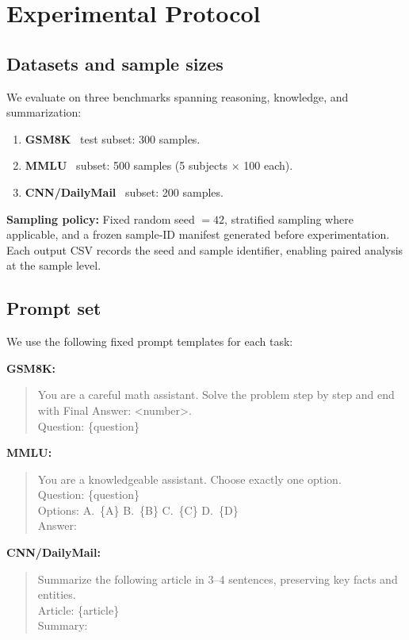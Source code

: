 \section{Experimental Protocol}
\label{sec:protocol}

\subsection{Datasets and sample sizes}

We evaluate on three benchmarks spanning reasoning, knowledge, and summarization:
\begin{enumerate}
    \item \textbf{GSM8K}~\cite{Cobbe2021} test subset: 300 samples.
    \item \textbf{MMLU}~\cite{Hendrycks2020} subset: 500 samples (5 subjects $\times$ 100 each).
    \item \textbf{CNN/DailyMail}~\cite{Narayan2018} subset: 200 samples.
\end{enumerate}

\noindent\textbf{Sampling policy:} Fixed random seed $= 42$, stratified sampling where applicable, and a frozen sample-ID manifest generated before experimentation. Each output CSV records the seed and sample identifier, enabling paired analysis at the sample level.

\subsection{Prompt set}

We use the following fixed prompt templates for each task:

\smallskip\noindent\textbf{GSM8K:}
\begin{quote}\small
You are a careful math assistant. Solve the problem step by step and end with
Final Answer: \textless number\textgreater.\\
Question: \{question\}
\end{quote}

\noindent\textbf{MMLU:}
\begin{quote}\small
You are a knowledgeable assistant. Choose exactly one option.\\
Question: \{question\}\\
Options: A.~\{A\} B.~\{B\} C.~\{C\} D.~\{D\}\\
Answer:
\end{quote}

\noindent\textbf{CNN/DailyMail:}
\begin{quote}\small
Summarize the following article in 3--4 sentences, preserving key facts and entities.\\
Article: \{article\}\\
Summary:
\end{quote}
